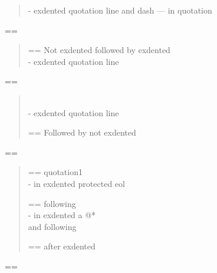 \documentclass{book}
\makeatletter
\newenvironment{Texinfopreformatted}{%
  \par\GNUTobeylines\obeyspaces\frenchspacing\parskip=\z@\parindent=\z@}{}
{\catcode`\^^M=13 \gdef\GNUTobeylines{\catcode`\^^M=13 \def^^M{\null\par}}}
\newenvironment{Texinfoindented}{\begin{list}{}{}\item\relax}{\end{list}}
\renewcommand{\_}{\Texinfounderscore\discretionary{}{}{}}
\makeatother
\begin{document}
\begin{Texinfoindented}
\begin{quote}
\hbox{\kern -\leftmargin}%
exdented quotation line   and dash --- in quotation
\\
\end{quote}
\begin{Texinfopreformatted}%
\ttfamily 
\end{Texinfopreformatted}
\begin{quote}
\begin{Texinfopreformatted}%
\ttfamily Not exdented followed by exdented
\end{Texinfopreformatted}
\leavevmode{}\\
\hbox{\kern -\leftmargin}%
exdented quotation line
\\
\end{quote}
\begin{Texinfopreformatted}%
\ttfamily 
\end{Texinfopreformatted}
\begin{quote}
\leavevmode{}\\
\hbox{\kern -\leftmargin}%
exdented quotation line
\\
\begin{Texinfopreformatted}%
\ttfamily Followed by not exdented 
\end{Texinfopreformatted}
\end{quote}
\begin{Texinfopreformatted}%
\ttfamily 
\end{Texinfopreformatted}
\begin{quote}
\begin{Texinfopreformatted}%
\ttfamily quotation1
\end{Texinfopreformatted}
\leavevmode{}\\
\hbox{\kern -\leftmargin}%
in exdented protected eol \ {}
\\
\begin{Texinfopreformatted}%
\ttfamily following
\end{Texinfopreformatted}
\leavevmode{}\\
\hbox{\kern -\leftmargin}%
in exdented a @* \leavevmode{}\\ and following
\\
\begin{Texinfopreformatted}%
\ttfamily after exdented
\end{Texinfopreformatted}
\end{quote}
\begin{Texinfopreformatted}%
\ttfamily 
\end{Texinfopreformatted}
\begin{quote}

\end{quote}
\end{Texinfoindented}
\end{document}

